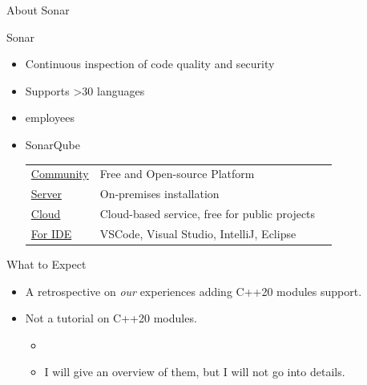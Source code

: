 \documentclass[aspectratio=169]{beamer}
\begin{document}
\begin{frame}{About Sonar}
  \begin{block}{Sonar}
    \begin{itemize}
      \item Continuous inspection of code quality and security
      \item Supports >30 languages
      \item {} employees      
      \item SonarQube \\
            \vspace{0.5em}
            \small \begin{tabular}{l l r}
              \href{https://www.sonarsource.com/open-source-editions/sonarqube-community-edition/}{Community} & Free and Open-source Platform                 &                                                           \\ \vspace{0.2em}
              \href{https://www.sonarsource.com/products/sonarqube/}{Server}                                  & On-premises installation                      & \raisebox{-.25\height}{} \\ \vspace{0.2em}
              \href{https://sonarcloud.io/login}{Cloud}                                                       & Cloud-based service, free for public projects & \raisebox{-.25\height}{} \\ \vspace{0.2em}
              \href{https://www.sonarsource.com/products/sonarlint/}{For IDE}                                 & VSCode, Visual Studio, IntelliJ, Eclipse      & \raisebox{-.25\height}{} \\
            \end{tabular}
    \end{itemize}
  \end{block}
\end{frame}

\begin{frame}{What to Expect}
  \begin{block}{}
    \begin{itemize}
      \item A retrospective on \emph{our} experiences adding C++20 modules support.
      \item Not a tutorial on C++20 modules.
            \begin{itemize}
              \item \cite{Weis24}
              \item I will give an overview of them, but I will not go into details.
            \end{itemize}
    \end{itemize}
  \end{block}
\end{frame}
\end{document}
